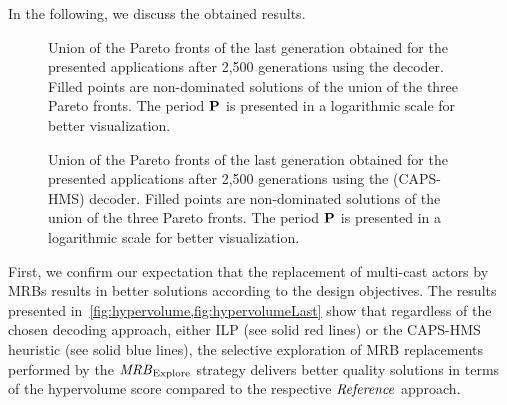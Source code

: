 In the following, we discuss the obtained results.
\par
\begin{figure*}[t!]
  \vspace{-5mm}
  \centering
  \resizebox{\textwidth}{!}{
    \begin{tikzpicture}
	\ParetoILP
    \end{tikzpicture}}
  \caption{\label{fig:ParetoFrontsILP}Union of the Pareto fronts of the last generation obtained for the presented applications after 2,500 generations using the  decoder.
    Filled points are non-dominated solutions of the union of the three Pareto fronts.
    The period $\mathbf{P}$ is presented in a logarithmic scale for better visualization.\vspace{-1mm}}
\end{figure*}
\begin{figure*}[t!]
  \vspace{-4mm}
  \centering
  \resizebox{\textwidth}{!}{
    \begin{tikzpicture}
	\ParetoHeuristicBindingsDSE
    \end{tikzpicture}}
  \caption{\label{fig:ParetoFrontsHeuristic}Union of the Pareto fronts of the last generation obtained for the presented applications after 2,500 generations using the  (\ac{CAPS-HMS}) decoder. Filled points are non-dominated solutions of the union of the three Pareto fronts.
    The period $\mathbf{P}$ is presented in a logarithmic scale for better visualization.\vspace{-1mm}}
\end{figure*}
\par
\KeyObservation
First, we confirm our expectation that 
the replacement of multi-cast actors by \acp{MRB} results in better solutions according to the design objectives.
The results presented in~\cref{fig:hypervolume,fig:hypervolumeLast} show that regardless of the chosen decoding approach, either \ac{ILP} (see solid red lines) or the \ac{CAPS-HMS} heuristic (see solid blue lines), the selective exploration of \ac{MRB} replacements performed by the ${\it MRB}_{\mathrm{Explore}}$ strategy delivers better quality solutions in terms of the hypervolume score compared to the respective ${\it Reference}$ approach.
